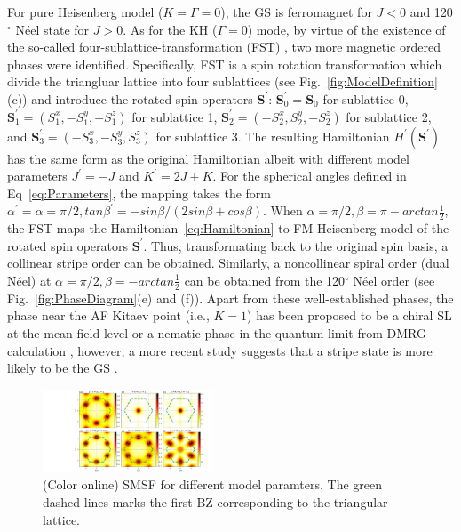 \documentclass[aps,prb,reprint,amsfonts,amsmath,amssymb,showpacs,groupedaddress,superscriptaddress]{revtex4-1}
\begin{document}
For pure Heisenberg model ($K=\Gamma=0$), the GS is ferromagnet for $J<0$ and 120$^\circ$ N\'{e}el state for $J>0$. As for the KH ($\Gamma=0$) mode, by virtue of the existence of the so-called four-sublattice-transformation (FST) \cite{PhysRevB.89.014414}, two more magnetic ordered phases were identified. Specifically, FST is a spin rotation transformation which divide the triangluar lattice into four sublattices (see Fig.~\ref{fig:ModelDefinition}(c)) and introduce the rotated spin operators $\bm{S}^{'}$: $\bm{S}_{0}^{'} = \bm{S}_0$ for sublattice 0, $\bm{S}_{1}^{'} = (S_1^x, -S_1^y, -S_1^z)$ for sublattice 1, $\bm{S}_{2}^{'} = (-S_2^x, S_2^y, -S_2^z)$ for sublattice 2, and $\bm{S}_{3}^{'} = (-S_3^x, -S_3^y, S_3^z)$ for sublattice 3. The resulting Hamiltonian $H^{'}(\bm{S}^{'})$ has the same form as the original Hamiltonian albeit with different model parameters $J^{'} = -J$ and $K^{'} = 2J + K$. For the spherical angles defined in Eq~\eqref{eq:Parameters}, the mapping takes the form $\alpha^{'}=\alpha=\pi/2, tan\beta^{'}=-sin\beta/(2sin\beta + cos\beta)$. When $\alpha=\pi/2, \beta=\pi - arctan\frac{1}{2}$, the FST maps the Hamiltonian~\eqref{eq:Hamiltonian} to FM Heisenberg model of the rotated spin operators $\bm{S}^{'}$. Thus, transformating back to the original spin basis, a collinear stripe order can be obtained. Similarly, a noncollinear spiral order (dual N\'{e}el) at $\alpha=\pi/2, \beta=-arctan\frac{1}{2}$ can be obtained from the 120$^\circ$ N\'{e}el order (see Fig.~\ref{fig:PhaseDiagram}(e) and (f)). Apart from these well-established phases, the phase near the AF Kitaev point (i.e., $K=1$) has been proposed to be a chiral SL at the mean field level \cite{KaiLi2015} or a nematic phase in the quantum limit from DMRG calculation \cite{PhysRevB.91.155135}, however, a more recent study suggests that a stripe state is more likely to be the GS \cite{PhysRevX.9.021017}.

\begin{figure}
    \includegraphics[width=0.45\textwidth]{Fig3.pdf}
    \caption{\label{fig:StructureFactors}(Color online) SMSF for different model paramters. The green dashed lines marks the first BZ corresponding to the triangular lattice.}
\end{figure}
\end{document}
